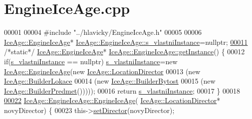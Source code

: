 \hypertarget{EngineIceAge_8cpp_source}{}\section{Engine\+Ice\+Age.\+cpp}
\label{EngineIceAge_8cpp_source}

\begin{DoxyCode}
00001 
00004 \textcolor{preprocessor}{#include "../hlavicky/EngineIceAge.h"}
00005 
00006 \hyperlink{classIceAge_1_1EngineIceAge}{IceAge::EngineIceAge}* 
      \hyperlink{classIceAge_1_1EngineIceAge_a3a28dd4c3cde5578060cf2463a9802c2}{IceAge::EngineIceAge::s\_vlastniInstance}=\textcolor{keyword}{nullptr}; 
\hypertarget{EngineIceAge_8cpp_source.tex_l00011}{}\hyperlink{classIceAge_1_1EngineIceAge_aa542969934711aa691e0df3da701e830}{00011} \textcolor{comment}{/*static*/} \hyperlink{classIceAge_1_1EngineIceAge}{IceAge::EngineIceAge}* 
      \hyperlink{classIceAge_1_1EngineIceAge_aa542969934711aa691e0df3da701e830}{IceAge::EngineIceAge::getInstance}() \{
00012     \textcolor{keywordflow}{if}(\hyperlink{classIceAge_1_1EngineIceAge_a3a28dd4c3cde5578060cf2463a9802c2}{s\_vlastniInstance} == \textcolor{keyword}{nullptr}) \hyperlink{classIceAge_1_1EngineIceAge_a3a28dd4c3cde5578060cf2463a9802c2}{s\_vlastniInstance}=\textcolor{keyword}{new} 
      \hyperlink{classIceAge_1_1EngineIceAge}{IceAge::EngineIceAge}(\textcolor{keyword}{new} \hyperlink{classIceAge_1_1LocationDirector}{IceAge::LocationDirector}
00013                                                                                 (\textcolor{keyword}{new} 
      \hyperlink{classIceAge_1_1BuilderLokace}{IceAge::BuilderLokace}
00014                                                                                 (\textcolor{keyword}{new} 
      \hyperlink{classIceAge_1_1BuilderBytost}{IceAge::BuilderBytost}
00015                                                                                 (\textcolor{keyword}{new} 
      \hyperlink{classIceAge_1_1BuilderPredmet}{IceAge::BuilderPredmet}()))));
00016     \textcolor{keywordflow}{return} \hyperlink{classIceAge_1_1EngineIceAge_a3a28dd4c3cde5578060cf2463a9802c2}{s\_vlastniInstance};
00017 \}
00018 
\hypertarget{EngineIceAge_8cpp_source.tex_l00022}{}\hyperlink{classIceAge_1_1EngineIceAge_a3d8cd1fe7b887a32a80583237352a1cc}{00022} \hyperlink{classIceAge_1_1EngineIceAge_a3d8cd1fe7b887a32a80583237352a1cc}{IceAge::EngineIceAge::EngineIceAge}(
      \hyperlink{classIceAge_1_1LocationDirector}{IceAge::LocationDirector}* novyDirector) \{
00023     this->\hyperlink{classIceAge_1_1EngineIceAge_ab3f8cd94dafb051af4e751fb34914cb2}{setDirector}(novyDirector);

\end{DoxyCode}
